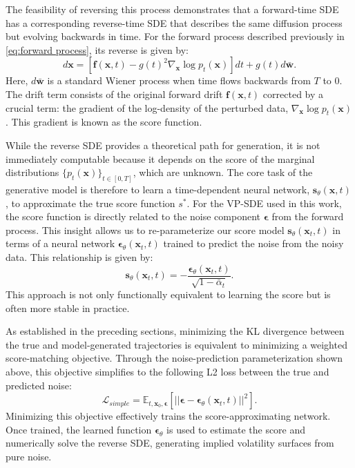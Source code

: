 \documentclass{article}
\begin{document}
The feasibility of reversing this process \citet{Anderson_1982} demonstrates that a forward-time SDE has a corresponding reverse-time SDE that describes the same diffusion process but evolving backwards in time. For the forward process described previously in \eqref{eq:forward process}, its reverse is given by:
$$ d\mathbf{x} = [\mathbf{f}(\mathbf{x}, t) - g(t)^2 \nabla_{\mathbf{x}}\log p_t(\mathbf{x})]dt + g(t)d\bar{\mathbf{w}}.$$
Here, $d\bar{\mathbf{w}}$ is a standard Wiener process when time flows backwards from $T$ to $0$. The drift term consists of the original forward drift $\mathbf{f}(\mathbf{x}, t)$ corrected by a crucial term: the gradient of the log-density of the perturbed data, $\nabla_{\mathbf{x}}\log p_t(\mathbf{x})$. This gradient is known as the score function.

While the reverse SDE provides a theoretical path for generation, it is not immediately computable because it depends on the score of the marginal distributions $\{p_t(\mathbf{x})\}_{t \in [0,T]}$, which are unknown. The core task of the generative model is therefore to learn a time-dependent neural network, $\mathbf{s}_\theta(\mathbf{x}, t)$, to approximate the true score function $s^*$. For the VP-SDE used in this work, the score function is directly related to the noise component $\boldsymbol{\epsilon}$ from the forward process. This insight allows us to re-parameterize our score model $\mathbf{s}_\theta(\mathbf{x}_t, t)$ in terms of a neural network $\boldsymbol{\epsilon}_\theta(\mathbf{x}_t, t)$ trained to predict the noise from the noisy data. This relationship is given by:
$$
\mathbf{s}_\theta(\mathbf{x}_t, t) = -\frac{\boldsymbol{\epsilon}_\theta(\mathbf{x}_t, t)}{\sqrt{1 - \bar{\alpha}_t}}.
$$
This approach is not only functionally equivalent to learning the score but is often more stable in practice.

As established in the preceding sections, minimizing the KL divergence between the true and model-generated trajectories is equivalent to minimizing a weighted score-matching objective. Through the noise-prediction parameterization shown above, this objective simplifies to the following L2 loss between the true and predicted noise:
\begin{equation}
    \mathcal{L}_{simple} = \mathbb{E}_{t, \mathbf{x}_0, \boldsymbol{\epsilon}} \left[ ||\boldsymbol{\epsilon} - \boldsymbol{\epsilon}_\theta(\mathbf{x}_t, t)||^2 \right].
\end{equation}
Minimizing this objective effectively trains the score-approximating network. Once trained, the learned function $\boldsymbol{\epsilon}_\theta$ is used to estimate the score and numerically solve the reverse SDE, generating implied volatility surfaces from pure noise.
\end{document}
